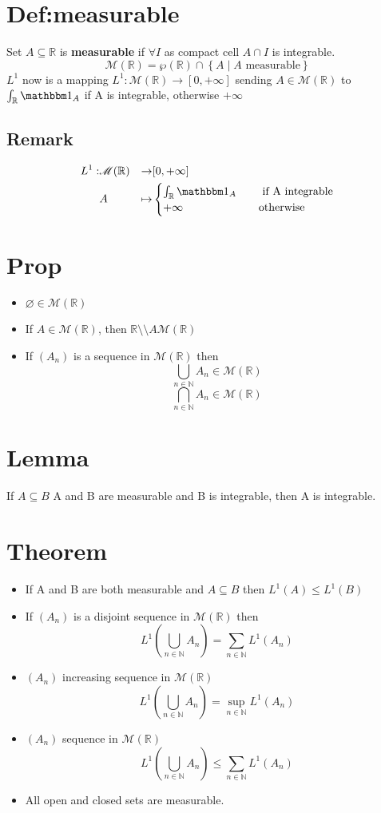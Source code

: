 \documentclass{book}
\newcommand{\set}[1]{\left\{#1\right\}}
\begin{document}
\section{Def:measurable}
Set $A\subseteq \mathbb R$ is \textbf{measurable} if $\forall I$ as compact cell $A\cap I$ is integrable.$$\mathscr{M}(\mathbb R)=\wp(\mathbb R)\cap\set{A\mid A\text{ measurable}}$$
$L^1$ now is a mapping $L^1:\mathscr M(\mathbb R)\to [0,+\infty]$ sending $A\in \mathscr{M}(\mathbb R)$ to $\int_{\mathbb R}\mathbbm 1_A$ if A is integrable, otherwise $+\infty$
\subsection*{Remark}$$\begin{aligned}
    L^1: &\mathscr M(\mathbb R)&\to &[0,+\infty]\\
    &A&\mapsto &\begin{cases}
        \int_{\mathbb R}\mathbbm 1_A\quad &\text{ if A integrable}\\ 
        +\infty\quad &\text{otherwise}
    \end{cases}
\end{aligned}$$
\section{Prop}
\begin{itemize}
    \item $\varnothing\in \mathscr M(\mathbb R)$
    \item If $A\in \mathscr M(\mathbb R)$, then $\mathbb R\setminus\setminus A\mathscr M(\mathbb R)$
    \item If $(A_n)$ is a sequence in $\mathscr M(\mathbb R)$ then$$\bigcup\limits_{n\in \mathbb N}A_n\in \mathscr M(\mathbb R)$$$$\bigcap\limits_{n\in \mathbb N}A_n\in \mathscr M(\mathbb R)$$ 
\end{itemize}
\section{Lemma}If $A\subseteq B$ A and B are measurable and B is integrable, then A is integrable.
\section{Theorem}
\begin{itemize}
    \item If A and B are both measurable and $A\subseteq B$ then $L^1(A)\leq L^1(B)$
    \item If $(A_n)$ is a disjoint sequence in $\mathscr M(\mathbb R)$ then $$L^1(\bigcup\limits_{n\in \mathbb N}A_n)=\sum\limits_{n\in \mathbb N}L^1(A_n)$$
    \item $(A_n)$ increasing sequence in $\mathscr M(\mathbb R)$$$L^1(\bigcup\limits_{n\in \mathbb N}A_n)=\sup\limits_{n\in \mathbb N}L^1(A_n)$$
    \item $(A_n)$ sequence in $\mathscr M(\mathbb R)$$$L^1(\bigcup\limits_{n\in \mathbb N}A_n)\leq\sum\limits_{n\in \mathbb N}L^1(A_n)$$
    \item All open and closed sets are measurable.
\end{itemize}
\end{document}
